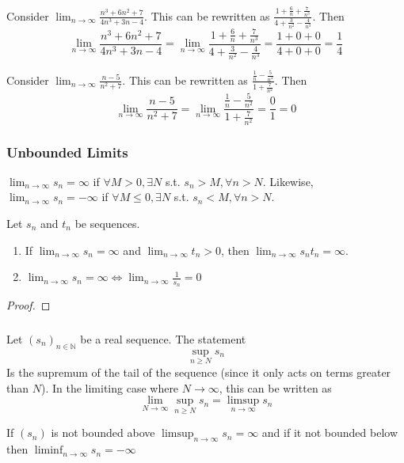 \documentclass[../notes.tex]{subfiles}
\begin{document}
\begin{example}
    Consider $\lim_{n\to\infty} \frac{n^3 + 6n^2 +7}{4n^3 + 3n - 4}$. This can be rewritten as $\frac{1 + \frac{6}{n} + \frac{7}{n^3}}{4 + \frac{3}{n^2} - \frac{4}{n^3}}$. Then
    \[
        \lim_{n\to\infty} \frac{n^3 + 6n^2 +7}{4n^3 + 3n - 4} = \lim_{n\to\infty} \frac{1 + \frac{6}{n} + \frac{7}{n^3}}{4 + \frac{3}{n^2} - \frac{4}{n^3}} = \frac{1 + 0 + 0}{4 + 0 + 0} = \frac{1}{4}
    \]
\end{example}
\begin{example}
    Consider $\lim_{n\to\infty} \frac{n-5}{n^2 + 7}$. This can be rewritten as $\frac{\frac{1}{n} - \frac{5}{n^2}}{1 + \frac{7}{n^2}}$. Then
    \[
        \lim_{n\to\infty} \frac{n-5}{n^2 + 7} = \lim_{n\to\infty} \frac{\frac{1}{n} - \frac{5}{n^2}}{1 + \frac{7}{n^2}} = \frac{0}{1} = 0
    \]
\end{example}

\subsubsection{Unbounded Limits}
\begin{definition}
    $\lim_{n\to\infty} s_n = \infty$ if $\forall M > 0, \exists N$ s.t. $s_n > M, \forall n > N$. Likewise, $\lim_{n\to\infty} s_n = -\infty$ if $\forall M \leq 0, \exists N$ s.t. $s_n < M, \forall n > N$.
\end{definition}

\begin{theorem}
    Let $s_n$ and $t_n$ be sequences.
    \begin{enumerate}
        \item If $\lim_{n\to\infty} s_n = \infty$ and $\lim_{n\to\infty} t_n > 0$, then $\lim_{n\to\infty} s_n t_n = \infty$.
        \item $\lim_{n\to\infty} s_n = \infty \Leftrightarrow \lim_{n\to\infty} \frac{1}{s_n} = 0$
    \end{enumerate}
\end{theorem}
\begin{proof}
\end{proof}

\subsubsection{}
\begin{definition}[hi]
    Let $(s_n)_{n \in \mathbb{N}}$ be a real sequence. The statement
    \[
        \sup_{n \geq N} s_n
    \]
    Is the supremum of the tail of the sequence (since it only acts on terms greater than $N$). In the limiting case where $N \to \infty$, this can be written as
    \[
        \lim_{N \to \infty} \sup_{n \geq N} s_n = \limsup_{n\to\infty} s_n
    \]
\end{definition}
\begin{remark}
    If $(s_n)$ is not bounded above $\limsup_{n \to \infty} s_n = \infty$ and if it not bounded below then $\liminf_{n \to \infty} s_n = -\infty$
\end{remark}
\end{document}
